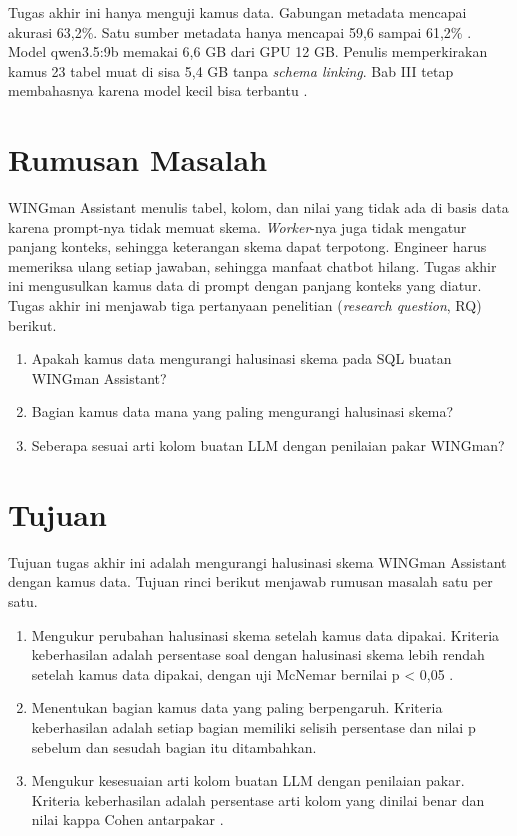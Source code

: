 Tugas akhir ini hanya menguji kamus data. Gabungan metadata mencapai akurasi 63,2\%. Satu sumber metadata hanya mencapai 59,6 sampai 61,2\% \autocite{shkapenyuk2025automaticmetadataextractiontexttosql}. Model qwen3.5:9b memakai 6,6 GB dari GPU 12 GB. Penulis memperkirakan kamus 23 tabel muat di sisa 5,4 GB tanpa \emph{schema linking}. Bab III tetap membahasnya karena model kecil bisa terbantu \autocite{maamari2024deathschemalinking}.

\section{Rumusan Masalah}
WINGman Assistant menulis tabel, kolom, dan nilai yang tidak ada di basis data karena prompt-nya tidak memuat skema. \emph{Worker}-nya juga tidak mengatur panjang konteks, sehingga keterangan skema dapat terpotong. Engineer harus memeriksa ulang setiap jawaban, sehingga manfaat chatbot hilang. Tugas akhir ini mengusulkan kamus data di prompt dengan panjang konteks yang diatur. Tugas akhir ini menjawab tiga pertanyaan penelitian (\emph{research question}, RQ) berikut.

\begin{enumerate}
\item	Apakah kamus data mengurangi halusinasi skema pada SQL buatan WINGman Assistant?
\item	Bagian kamus data mana yang paling mengurangi halusinasi skema?
\item	Seberapa sesuai arti kolom buatan LLM dengan penilaian pakar WINGman?
\end{enumerate}

\section{Tujuan}
Tujuan tugas akhir ini adalah mengurangi halusinasi skema WINGman Assistant dengan kamus data. Tujuan rinci berikut menjawab rumusan masalah satu per satu.

\begin{enumerate}
\item	Mengukur perubahan halusinasi skema setelah kamus data dipakai. Kriteria keberhasilan adalah persentase soal dengan halusinasi skema lebih rendah setelah kamus data dipakai, dengan uji McNemar bernilai p < 0,05 \autocite{dietterich1998approximate}.
\item	Menentukan bagian kamus data yang paling berpengaruh. Kriteria keberhasilan adalah setiap bagian memiliki selisih persentase dan nilai p sebelum dan sesudah bagian itu ditambahkan.
\item	Mengukur kesesuaian arti kolom buatan LLM dengan penilaian pakar. Kriteria keberhasilan adalah persentase arti kolom yang dinilai benar dan nilai kappa Cohen antarpakar \autocite{cohen1960coefficient}.
\end{enumerate}

